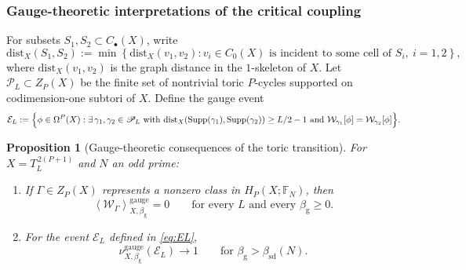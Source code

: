 \documentclass[dvipsnames,a4paper]{article}
\numberwithin{equation}{section}
\newtheorem{prop}[theorem]{Proposition}
\theoremstyle{definition}
\theoremstyle{remark}
\newcommand{\Supp}{\mathrm{Supp}}
\begin{document}
\subsubsection{Gauge-theoretic interpretations of the critical coupling}

For subsets \(S_1,S_2\subset C_\bullet(X)\), write
\begin{equation}
	\mathrm{dist}_X(S_1,S_2)
	:=
	\min\left\{
	\mathrm{dist}_X(v_1,v_2):
	v_i\in C_0(X)\text{ is incident to some cell of }S_i,\ i=1,2
	\right\},
	\label{eq:dist-subsets}
\end{equation}
where \(\mathrm{dist}_X(v_1,v_2)\) is the graph distance in the \(1\)-skeleton of
\(X\). Let \(\mathscr P_L\subset Z_P(X)\) be the finite set of nontrivial toric
\(P\)-cycles supported on codimension-one subtori of \(X\). Define the gauge
event
\begin{equation}
	\mathcal E_L
	:=
	\Bigl\{
	\phi\in\Omega^P(X):
	\exists\,\gamma_1,\gamma_2\in\mathscr P_L
	\text{ with }
	\mathrm{dist}_X(\Supp(\gamma_1),\Supp(\gamma_2))\ge L/2-1
	\text{ and }
	\mathcal W_{\gamma_1}[\phi]=\mathcal W_{\gamma_2}[\phi]
	\Bigr\}.
	\label{eq:EL}
\end{equation}

\begin{prop}[Gauge-theoretic consequences of the toric transition]
	\label{prop:toric-gauge-consequences}
	For \(X=T_L^{\,2(P+1)}\) and \(N\) an odd prime:
	\begin{enumerate}
		\item
		If \(\Gamma\in Z_P(X)\) represents a nonzero class in
		\(H_P(X;\mathbb F_N)\), then
		\begin{equation}
			\left\langle \mathcal W_\Gamma \right\rangle^{\mathrm{gauge}}_{X,\beta_{\mathrm g}}
			=
			0
			\qquad
			\text{for every }L\text{ and every }\beta_{\mathrm g}\ge 0.
			\label{eq:single-toric-loop-zero}
		\end{equation}
		
		\item
		For the event \(\mathcal E_L\) defined in \eqref{eq:EL},
		\begin{equation}
			\nu^{\mathrm{gauge}}_{X,\beta_{\mathrm g}}(\mathcal E_L)\to 1
			\qquad
			\text{for }\beta_{\mathrm g}>\beta_{\mathrm{sd}}(N).
			\label{eq:EL-high}
		\end{equation}
	\end{enumerate}
\end{prop}
\end{document}
